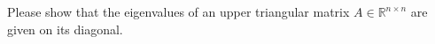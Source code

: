 Please show that the eigenvalues of an upper triangular matrix $A \in \mathbb{R}^{n \times n}$ are given on its diagonal.\\%



 